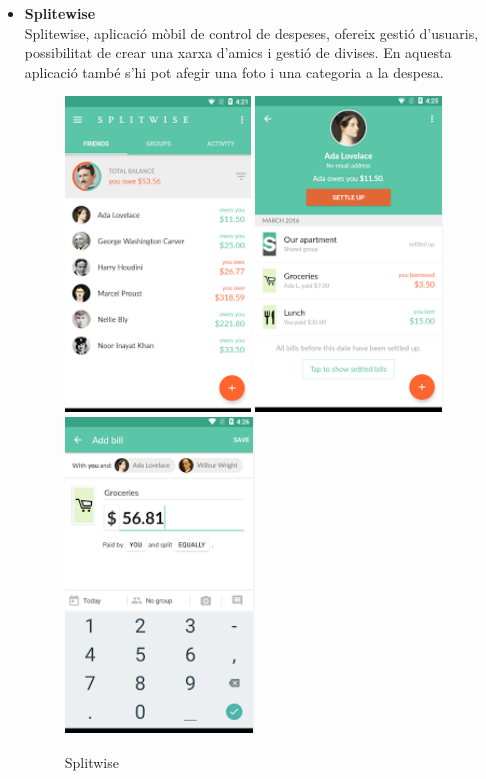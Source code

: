 \begin{itemize}
\begin{itemize}
\item{\textbf{Splitewise}}\\
Splitewise, aplicació mòbil de control de despeses, ofereix gestió d’usuaris, possibilitat de crear una xarxa d’amics i gestió de divises. En aquesta aplicació també s’hi pot afegir una foto i una categoria a la despesa.

\begin{figure}[!h]
\centering
\includegraphics[scale=0.90]{Figures/splitwise1.jpg}
\includegraphics[scale=0.90]{Figures/splitwise2.jpg}
\includegraphics[scale=0.90]{Figures/splitwise3.jpg}
\caption{Splitwise}
\end{figure}


\end{itemize}
\end{itemize}
